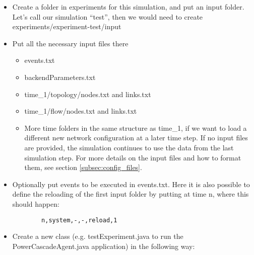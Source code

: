 \documentclass[11pt,fleqn]{book} %
\newcommand{\CascadeAgent}{CascadeAgent}
\newcommand{\backendParametersFile}{backendParameters.txt}
\begin{document}
\begin{itemize}
	\item Create a folder in experiments for this simulation, and put an input folder. Let’s call our simulation “test”, then we would need to create experiments/experiment-test/input
	\item Put all the necessary input files there
	\begin{itemize}
		\item events.txt
		\item \backendParametersFile{}
		\item time\_1/topology/nodes.txt and links.txt
		\item time\_1/flow/nodes.txt and links.txt
		\item More time folders in the same structure as time\_1, if we want to load a different new network configuration at a later time step. If no input files are provided, the simulation continues to use the data from the last simulation step. For more details on the input files and how to format them, see section \ref{subsec:config_files}.
	\end{itemize}
	\item Optionally put events to be executed in events.txt. Here it is also possible to define the reloading of the first input folder by putting at time n, where this should happen:
	\begin{lstlisting}
		n,system,-,-,reload,1
	\end{lstlisting}
	\item  Create a new class (e.g. testExperiment.java to run the Power\CascadeAgent{}.java application) in the following way:
\end{itemize}
\end{document}
